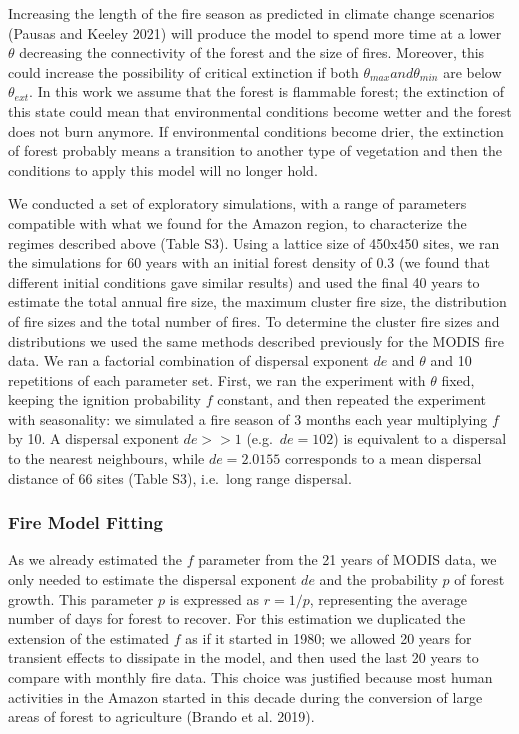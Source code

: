 \documentclass[
]{article}
\begin{document}
Increasing the length of the fire season as predicted in climate change
scenarios (Pausas and Keeley 2021) will produce the model to spend more
time at a lower \(\theta\) decreasing the connectivity of the forest and
the size of fires. Moreover, this could increase the possibility of
critical extinction if both \(\theta_{max} and \theta_{min}\) are below
\(\theta_{ext}\). In this work we assume that the forest is flammable
forest; the extinction of this state could mean that environmental
conditions become wetter and the forest does not burn anymore. If
environmental conditions become drier, the extinction of forest probably
means a transition to another type of vegetation and then the conditions
to apply this model will no longer hold.

We conducted a set of exploratory simulations, with a range of
parameters compatible with what we found for the Amazon region, to
characterize the regimes described above (Table S3). Using a lattice
size of 450x450 sites, we ran the simulations for 60 years with an
initial forest density of 0.3 (we found that different initial
conditions gave similar results) and used the final 40 years to estimate
the total annual fire size, the maximum cluster fire size, the
distribution of fire sizes and the total number of fires. To determine
the cluster fire sizes and distributions we used the same methods
described previously for the MODIS fire data. We ran a factorial
combination of dispersal exponent \(de\) and \(\theta\) and 10
repetitions of each parameter set. First, we ran the experiment with
\(\theta\) fixed, keeping the ignition probability \(f\) constant, and
then repeated the experiment with seasonality: we simulated a fire
season of 3 months each year multiplying \(f\) by 10. A dispersal
exponent \(de>>1\) (e.g.~\(de=102\)) is equivalent to a dispersal to the
nearest neighbours, while \(de=2.0155\) corresponds to a mean dispersal
distance of 66 sites (Table S3), i.e.~long range dispersal.

\subsubsection{Fire Model Fitting}\label{fire-model-fitting}

As we already estimated the \(f\) parameter from the 21 years of MODIS
data, we only needed to estimate the dispersal exponent \(de\) and the
probability \(p\) of forest growth. This parameter \(p\) is expressed as
\(r=1/p\), representing the average number of days for forest to
recover. For this estimation we duplicated the extension of the
estimated \(f\) as if it started in 1980; we allowed 20 years for
transient effects to dissipate in the model, and then used the last 20
years to compare with monthly fire data. This choice was justified
because most human activities in the Amazon started in this decade
during the conversion of large areas of forest to agriculture (Brando et
al. 2019).
\end{document}
